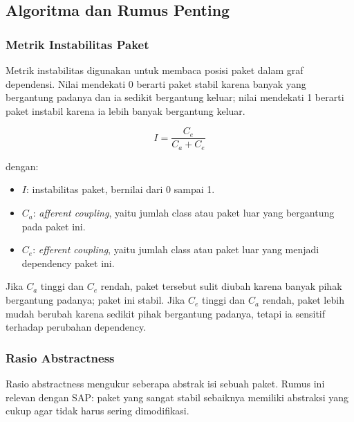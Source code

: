 \subsection{Algoritma dan Rumus Penting}

\subsubsection{Metrik Instabilitas Paket}

\begin{jawab}
Metrik instabilitas digunakan untuk membaca posisi paket dalam graf dependensi. Nilai mendekati 0 berarti paket stabil karena banyak yang bergantung padanya dan ia sedikit bergantung keluar; nilai mendekati 1 berarti paket instabil karena ia lebih banyak bergantung keluar.
\end{jawab}

\begin{equation}
    I = \frac{C_e}{C_a + C_e}
    \label{eq:instability}
\end{equation}

dengan:
\begin{itemize}
    \item $I$: instabilitas paket, bernilai dari 0 sampai 1.
    \item $C_a$: \textit{afferent coupling}, yaitu jumlah class atau paket luar yang bergantung pada paket ini.
    \item $C_e$: \textit{efferent coupling}, yaitu jumlah class atau paket luar yang menjadi dependency paket ini.
\end{itemize}

Jika $C_a$ tinggi dan $C_e$ rendah, paket tersebut sulit diubah karena banyak pihak bergantung padanya; paket ini stabil. Jika $C_e$ tinggi dan $C_a$ rendah, paket lebih mudah berubah karena sedikit pihak bergantung padanya, tetapi ia sensitif terhadap perubahan dependency.

\subsubsection{Rasio Abstractness}

\begin{jawab}
Rasio abstractness mengukur seberapa abstrak isi sebuah paket. Rumus ini relevan dengan SAP: paket yang sangat stabil sebaiknya memiliki abstraksi yang cukup agar tidak harus sering dimodifikasi.
\end{jawab}

